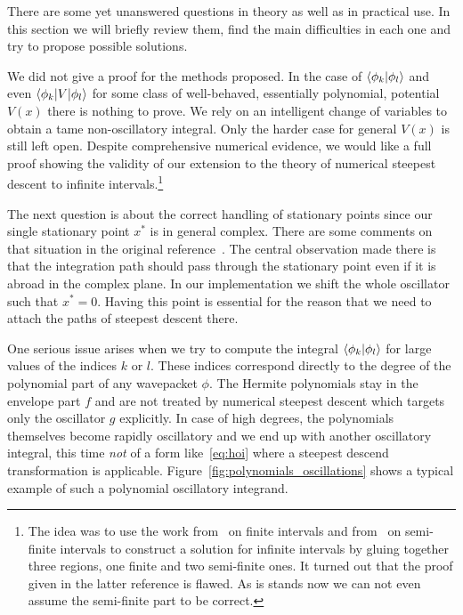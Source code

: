 \documentclass[a4paper,10pt]{article}
\begin{document}
There are some yet unanswered questions in theory as well as in practical use.
In this section we will briefly review them, find the main difficulties
in each one and try to propose possible solutions.

We did not give a proof for the methods proposed.
In the case of $\braket{\phi_k | \phi_l}$ and even $\braket{\phi_k | V | \phi_l}$
for some class of well-behaved, essentially polynomial, potential $V(x)$ there is
nothing to prove. We rely on an intelligent change of variables to obtain a tame
non-oscillatory integral. Only the harder case for general $V(x)$ is still left open.
Despite comprehensive numerical evidence, we would like a full proof showing the
validity of our extension to the theory of numerical steepest descent to infinite
intervals.\footnote{The idea was to use the work from~\cite{HV_hoq}
on finite intervals and from~\cite{H_nsd_sii} on semi-finite intervals
to construct a solution for infinite intervals by gluing together three regions,
one finite and two semi-finite ones. It turned out that the proof
given in the latter reference is flawed. As is stands now we can not even assume
the semi-finite part to be correct.}

The next question is about the correct handling of stationary points since our
single stationary point $x^{*}$ is in general complex. There are some comments on
that situation in the original reference~\cite{HV_hoq}. The central observation made
there is that the integration path should pass through the stationary point even if
it is abroad in the complex plane. In our implementation we shift the whole oscillator
such that $x^{*} = 0$. Having this point is essential for the reason that we need to
attach the paths of steepest descent there.

One serious issue arises when we try to compute the integral $\braket{\phi_k|\phi_l}$
for large values of the indices $k$ or $l$. These indices correspond directly to the
degree of the polynomial part of any wavepacket $\phi$. The Hermite polynomials
stay in the envelope part $f$ and are not treated by numerical steepest descent which
targets only the oscillator $g$ explicitly. In case of high degrees, the polynomials
themselves become rapidly oscillatory and we end up with another oscillatory integral,
this time \emph{not} of a form like~\eqref{eq:hoi} where a steepest descend transformation
is applicable. Figure~\ref{fig:polynomials_oscillations} shows a typical example of
such a polynomial oscillatory integrand.
\end{document}
